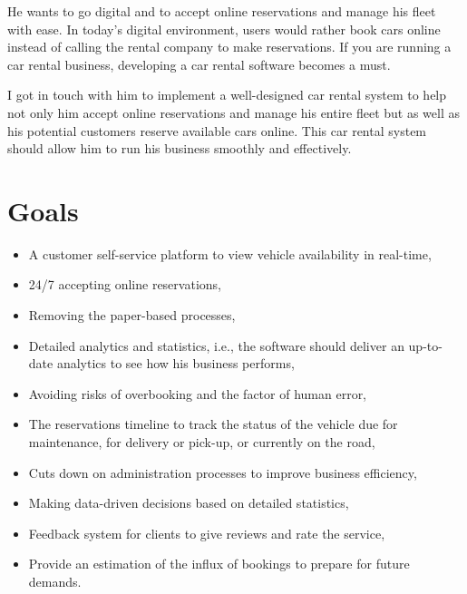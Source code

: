 \documentclass{article}
\begin{document}
        \vspace{0.3cm}
        
        He wants to go digital and to accept online reservations and manage his fleet with ease. In today’s digital environment, users would rather book cars online instead of calling the rental company to make reservations. If you are running a car rental business, developing a car rental software becomes a must. 
        
        \vspace{0.3cm}
        
        I got in touch with him to implement a well-designed car rental system to help not only him accept online reservations and manage his entire fleet but as well as his potential customers reserve available cars online. This car rental system should allow him to run his business smoothly and effectively.

\section{Goals}

  \begin{itemize}
  
	    \item A customer self-service platform to view vehicle              availability in real-time,
	    \item 24/7 accepting online reservations,
	    \item Removing the paper-based processes,
	    \item Detailed analytics and statistics, i.e., the software should deliver an up-to-date analytics to see how his business performs,
	    \item Avoiding risks of overbooking and the factor of          human error,
	    \item The reservations timeline to track the status of the vehicle due for maintenance, for delivery or pick-up, or currently on the road,
	    \item Cuts down on administration processes to improve         business efficiency,
	    \item Making data-driven decisions based on detailed           statistics,
	   \item Feedback system for clients to give reviews and rate the service,
	   \item Provide an estimation of the influx of bookings to prepare for future demands.
	   
	 \end{itemize}
\end{document}
